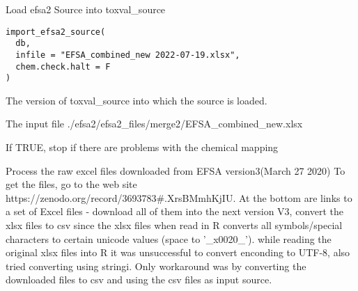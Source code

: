 \documentclass[letterpaper]{book}
\begin{document}
%
\begin{Description}\relax
Load efsa2 Source into toxval\_source
\end{Description}
%
\begin{Usage}
\begin{verbatim}
import_efsa2_source(
  db,
  infile = "EFSA_combined_new 2022-07-19.xlsx",
  chem.check.halt = F
)
\end{verbatim}
\end{Usage}
%
\begin{Arguments}
\begin{ldescription}
\item[\code{db}] The version of toxval\_source into which the source is loaded.

\item[\code{infile}] The input file ./efsa2/efsa2\_files/merge2/EFSA\_combined\_new.xlsx

\item[\code{chem.check.halt}] If TRUE, stop if there are problems with the chemical mapping
\end{ldescription}
\end{Arguments}
%
\begin{Description}\relax
Process the raw excel files downloaded from EFSA version3(March 27 2020)
To get the files, go to the web site
https://zenodo.org/record/3693783\#.XrsBMmhKjIU. At the bottom are links to
a set of Excel files - download all of them into the next version V3,
convert the xlsx files to csv since the xlsx files when read in R converts all symbols/special characters
to certain unicode values (space to '\_x0020\_'). while reading the original xlsx files into R
it was unsuccessful to convert enconding to UTF-8, also tried converting using stringi. Only workaround was
by converting the downloaded files to csv and using the csv files as input source.
\end{Description}
\end{document}
